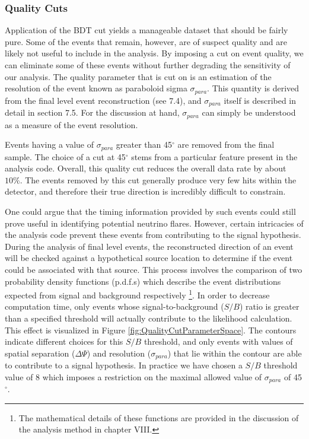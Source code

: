 \documentclass{gatech-thesis}
\begin{document}
\subsubsection{Quality Cuts}
Application of the BDT cut yields a manageable dataset that should be fairly pure. Some of the events that remain, however, are of suspect quality and are likely not useful to include in the analysis. By imposing a cut on event quality, we can eliminate some of these events without further degrading the sensitivity of our analysis. The quality parameter that is cut on is an estimation of the resolution of the event known as paraboloid sigma $\sigma_{para}$. This quantity is derived from the final level event reconstruction (see 7.4), and $\sigma_{para}$ itself is described in detail in section 7.5. For the discussion at hand, $\sigma_{para}$ can simply be understood as a measure of the event resolution.

Events having a value of $\sigma_{para}$ greater than 45$^{\circ}$ are removed from the final sample. The choice of a cut at 45$^{\circ}$ stems from a particular feature present in the analysis code. Overall, this quality cut reduces the overall data rate by about $10\%$. The events removed by this cut generally produce very few hits within the detector, and therefore their true direction is incredibly difficult to constrain.

One could argue that the timing information provided by such events could still prove useful in identifying potential neutrino flares. However, certain intricacies of the analysis code prevent these events from contributing to the signal hypothesis. During the analysis of final level events, the reconstructed direction of an event will be checked against a hypothetical source location to determine if the event could be associated with that source. This process involves the comparison of two probability density functions (p.d.f.s) which describe the event distributions expected from signal and background respectively \footnote{The mathematical details of these functions are provided in the discussion of the analysis method in chapter VIII.}. In order to decrease computation time, only events whose signal-to-background ($S/B$) ratio is greater than a specified threshold will actually contribute to the likelihood calculation. This effect is visualized in Figure \ref{fig:QualityCutParameterSpace}. The contours indicate different choices for this $S/B$ threshold, and only events with values of spatial separation ($\Delta \Psi$) and resolution ($\sigma_{para}$) that lie within the contour are able to contribute to a signal hypothesis. In practice we have chosen a $S/B$ threshold value of 8 which imposes a restriction on the maximal allowed value of $\sigma_{para}$ of 45$^{\circ}$.
\end{document}
